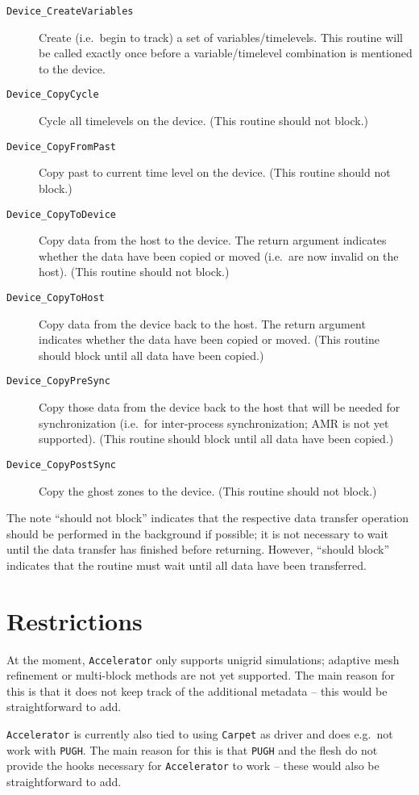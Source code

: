 \begin{description}
\item[\texttt{Device\_CreateVariables}] Create (i.e.\ begin to track)
  a set of variables/timelevels. This routine will be called exactly
  once before a variable/timelevel combination is mentioned to the
  device.
\item[\texttt{Device\_CopyCycle}] Cycle all timelevels on the device.
  (This routine should not block.)
\item[\texttt{Device\_CopyFromPast}] Copy past to current time level
  on the device. (This routine should not block.)
\item[\texttt{Device\_CopyToDevice}] Copy data from the host to the
  device. The return argument indicates whether the data have been
  copied or moved (i.e.\ are now invalid on the host). (This routine
  should not block.)
\item[\texttt{Device\_CopyToHost}] Copy data from the device back to
  the host. The return argument indicates whether the data have been
  copied or moved. (This routine should block until all data have been
  copied.)
\item[\texttt{Device\_CopyPreSync}] Copy those data from the device
  back to the host that will be needed for synchronization (i.e.\ for
  inter-process synchronization; AMR is not yet supported). (This
  routine should block until all data have been copied.)
\item[\texttt{Device\_CopyPostSync}] Copy the ghost zones to the
  device. (This routine should not block.)
\end{description}

The note ``should not block'' indicates that the respective data
transfer operation should be performed in the background if possible;
it is not necessary to wait until the data transfer has finished
before returning. However, ``should block'' indicates that the routine
must wait until all data have been transferred.



\section{Restrictions}

At the moment, \texttt{Accelerator} only supports unigrid simulations;
adaptive mesh refinement or multi-block methods are not yet supported.
The main reason for this is that it does not keep track of the
additional metadata -- this would be straightforward to add.

\texttt{Accelerator} is currently also tied to using \texttt{Carpet}
as driver and does e.g.\ not work with \texttt{PUGH}. The main reason
for this is that \texttt{PUGH} and the flesh do not provide the hooks
necessary for \texttt{Accelerator} to work -- these would also be
straightforward to add.



% 



